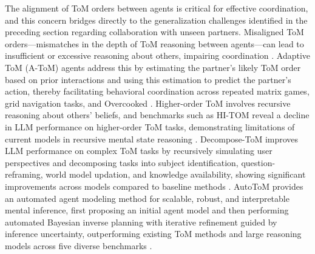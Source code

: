 \documentclass[11pt]{article}
\begin{document}
The alignment of ToM orders between agents is critical for effective coordination, and this concern bridges directly to the generalization challenges identified in the preceding section regarding collaboration with unseen partners. Misaligned ToM orders---mismatches in the depth of ToM reasoning between agents---can lead to insufficient or excessive reasoning about others, impairing coordination \cite{ref233}. Adaptive ToM (A-ToM) agents address this by estimating the partner's likely ToM order based on prior interactions and using this estimation to predict the partner's action, thereby facilitating behavioral coordination across repeated matrix games, grid navigation tasks, and Overcooked \cite{ref233}. Higher-order ToM involves recursive reasoning about others' beliefs, and benchmarks such as HI-TOM reveal a decline in LLM performance on higher-order ToM tasks, demonstrating limitations of current models in recursive mental state reasoning \cite{ref234}. Decompose-ToM improves LLM performance on complex ToM tasks by recursively simulating user perspectives and decomposing tasks into subject identification, question-reframing, world model updation, and knowledge availability, showing significant improvements across models compared to baseline methods \cite{ref235}. AutoToM provides an automated agent modeling method for scalable, robust, and interpretable mental inference, first proposing an initial agent model and then performing automated Bayesian inverse planning with iterative refinement guided by inference uncertainty, outperforming existing ToM methods and large reasoning models across five diverse benchmarks \cite{ref236}.
\end{document}
